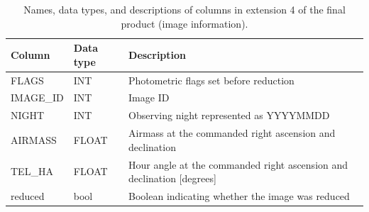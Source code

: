 \documentclass[fleqn,usenatbib]{mnras}
\begin{document}
\begin{table}
    \centering
    \caption{Names, data types, and descriptions of columns in extension 4 of the final product (image information).}
    \label{tab:final_product_cols_tab4}
    \begin{tabularx}{\textwidth}{@{}ll>{\raggedright\arraybackslash}X@{}}
    \toprule
    Column & Data type & Description \\
    \midrule
    FLAGS & INT & Photometric flags set before reduction \\
    IMAGE\_ID & INT & Image ID \\
    NIGHT & INT & Observing night represented as YYYYMMDD \\
    AIRMASS & FLOAT & Airmass at the commanded right ascension and declination \\
    TEL\_HA & FLOAT & Hour angle at the commanded right ascension and declination [degrees] \\
    reduced & bool & Boolean indicating whether the image was reduced \\
    \bottomrule
    \end{tabularx}
\end{table}
\end{document}
